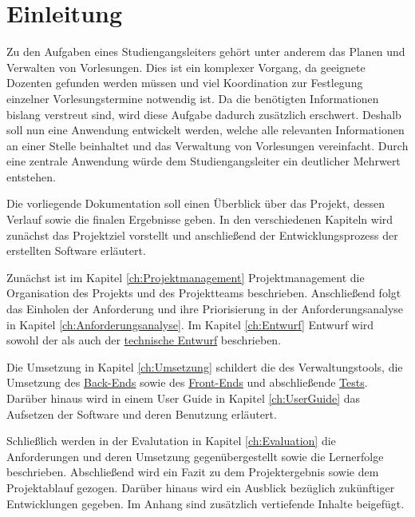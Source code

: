 \chapter{Einleitung}
Zu den Aufgaben eines Studiengangsleiters gehört unter anderem das Planen und Verwalten von Vorlesungen.
Dies ist ein komplexer Vorgang, da geeignete Dozenten gefunden werden müssen und viel Koordination zur Festlegung einzelner Vorlesungstermine notwendig ist.
Da die benötigten Informationen bislang verstreut sind, wird diese Aufgabe dadurch zusätzlich erschwert.
Deshalb soll nun eine Anwendung entwickelt werden, welche alle relevanten Informationen an einer Stelle beinhaltet und das Verwaltung von Vorlesungen vereinfacht.
Durch eine zentrale Anwendung würde dem Studiengangsleiter ein deutlicher Mehrwert entstehen.

Die vorliegende Dokumentation soll einen Überblick über das Projekt, dessen Verlauf sowie die finalen Ergebnisse geben.
In den verschiedenen Kapiteln wird zunächst das Projektziel vorstellt und anschließend der Entwicklungsprozess der erstellten Software erläutert.

Zunächst ist im Kapitel \vref{ch:Projektmanagement} Projektmanagement die Organisation des Projekts und des Projektteams beschrieben.
Anschließend folgt das Einholen der Anforderung und ihre Priorisierung in der Anforderungsanalyse in Kapitel \vref{ch:Anforderungsanalyse}.
Im Kapitel \vref{ch:Entwurf} Entwurf wird sowohl der  als auch der \hyperref[ch:Technischer Entwurf]{technische Entwurf} beschrieben.

Die Umsetzung in Kapitel \vref{ch:Umsetzung} schildert die  des Verwaltungstools, die Umsetzung des \hyperref[ch:BackEnd]{Back-Ends} sowie des \hyperref[ch:FrontEnd]{Front-Ends} und abschließende \hyperref[ch:Test]{Tests}.
Darüber hinaus wird in einem User Guide in Kapitel \vref{ch:UserGuide} das Aufsetzen der Software und deren Benutzung erläutert.

Schließlich werden in der Evalutation in Kapitel \vref{ch:Evaluation} die Anforderungen und deren Umsetzung gegenübergestellt sowie die Lernerfolge beschrieben.
Abschließend wird ein Fazit zu dem Projektergebnis sowie dem Projektablauf gezogen.
Darüber hinaus wird ein Ausblick bezüglich zukünftiger Entwicklungen gegeben.
Im Anhang sind zusätzlich vertiefende Inhalte beigefügt.